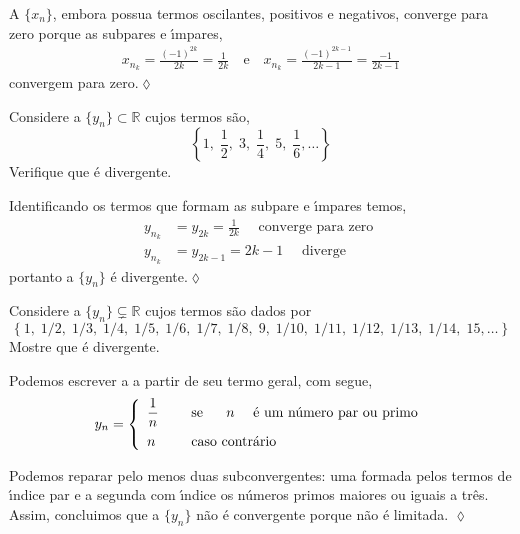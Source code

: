 \solo A \seq $\{x_n\}$, embora possua termos oscilantes, positivos e negativos, converge para zero porque as sub\seqs pares e \'{\i}mpares,
\begin{align*}
x_{n_k}=\frac{(-1)^{2k}}{2k}=\frac{1}{2k}\quad \text{e} \quad 
x_{n_k}=\frac{(-1)^{2k-1}}{2k-1}=\frac{-1}{2k-1}
\end{align*}
convergem para zero.\hfill \(\lozenge\)


\begin{exer}
Considere a \seq $\{y_n\}\subset \mathbb{R}$ cujos termos s\~{a}o,
\begin{equation*}
    \left\{1,\; \dfrac{1}{2},\; 3,\; \dfrac{1}{4},\; 5,\; \dfrac{1}{6},\ldots  \right\}
\end{equation*}
Verifique que \'{e} divergente.
\end{exer}

\solo Identificando os termos que formam as sub\seqs pare e \'{\i}mpares temos,
\begin{align*}
y_{n_k}&=y_{2k}=\frac{1}{2k} \quad \text{ converge para zero }\\[2ex]
y_{n_k}&=y_{2k-1}=2k-1\quad \text{ diverge}
\end{align*}
portanto a \seq $\{y_n\}$ \'{e} divergente.\hfill \(\lozenge\)


\begin{exer}
Considere a \seq $\{y_n\}\subsetneq \mathbb{R}$ cujos termos s\~{a}o dados por
\begin{equation*}
\left\{ 1,\; 1/2,\; 1/3,\; 1/4,\; 1/5,\; 1/6,\; 1/7,\;1/8,\; 9,\;1/10,\; 1/11,\; 1/12,\; 
1/13,\; 1/14,\; 15,\ldots \right\}
\end{equation*}
Mostre que \'{e} divergente.
\end{exer}

\solo Podemos escrever a \seq a partir de seu termo geral, com segue,
\begin{equation*}
y_{n}=\left\{
\begin{array}{ll}
\dfrac{1}{n} & \quad \hbox{ se }\quad \text{ $n$ } \quad \text{\'{e} um n\'{u}mero par ou primo}\\[2ex]
n & \quad \hbox{ caso contr\'{a}rio }
\end{array}
\right.
\end{equation*}

Podemos reparar pelo menos duas sub\seqs convergentes: uma formada pelos termos de \'{\i}ndice par e a segunda com \'{\i}ndice os n\'{u}meros primos maiores ou iguais a tr\^{e}s. Assim, concluimos que a \seq $\{y_n\}$ n\~{a}o \'{e} convergente porque n\~{a}o \'{e} limitada. \hfill \(\lozenge\)

